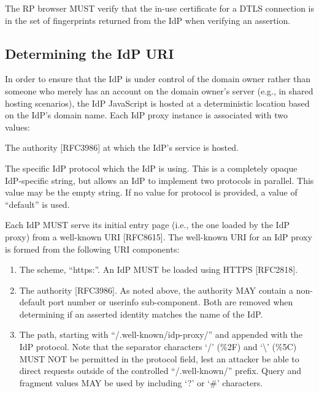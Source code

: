 \documentclass{article}
\begin{document}
The RP browser MUST verify that the in-use certificate for a DTLS
connection is in the set of fingerprints returned from the IdP when
verifying an assertion.

\subsection{Determining the IdP URI}

In order to ensure that the IdP is under control of the domain owner
rather than someone who merely has an account on the domain owner's
server (e.g., in shared hosting scenarios), the IdP JavaScript is
hosted at a deterministic location based on the IdP's domain name.
Each IdP proxy instance is associated with two values:

\begin{description}[style=nextline]
\item[authority:] The authority [RFC3986] at which the IdP's service is
  hosted.

\item[protocol:] The specific IdP protocol which the IdP is using.  This is
  a completely opaque IdP-specific string, but allows an IdP to
  implement two protocols in parallel.  This value may be the empty
  string.  If no value for protocol is provided, a value of
  ``default'' is used.
\end{description}

Each IdP MUST serve its initial entry page (i.e., the one loaded by
the IdP proxy) from a well-known URI [RFC8615].  The well-known URI
for an IdP proxy is formed from the following URI components:

\begin{enumerate}
\item The scheme, ``https:''.  An IdP MUST be loaded using HTTPS
  [RFC2818].

\item The authority [RFC3986].  As noted above, the authority MAY
  contain a non-default port number or userinfo sub-component.
  Both are removed when determining if an asserted identity matches
  the name of the IdP.

\item The path, starting with ``/.well-known/idp-proxy/'' and appended
  with the IdP protocol.  Note that the separator characters `/'
  (\%2F) and `\textbackslash' (\%5C) MUST NOT be permitted in the protocol field,
  lest an attacker be able to direct requests outside of the
  controlled ``/.well-known/'' prefix.  Query and fragment values MAY
  be used by including `?' or `\#' characters.
\end{enumerate}
\end{document}
